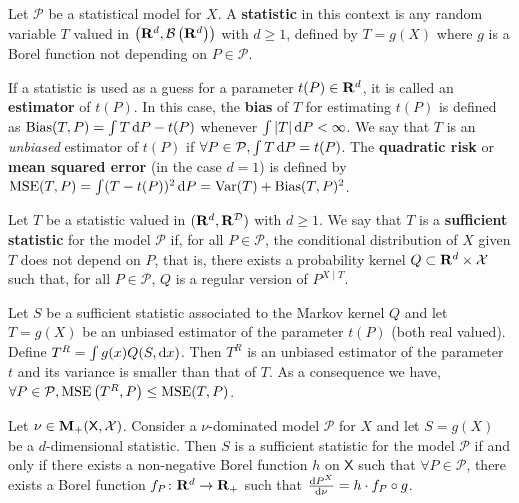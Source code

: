 	\begin{defn}
		Let $\mathcal{P}$ be a statistical model for $X$.
		A \textbf{statistic} in this context is any random variable $T$ valued in $\left(\mathbf{R}^d, \mathcal{B}\left( \mathbf{R}^d \right)\right)$ with $d \geq 1$, defined by $T = g(X)$ where $g$ is a Borel function not depending on $P \in \mathcal{P}$.
	\end{defn}

	If a statistic is used as a guess for a parameter $t(P) \in \mathbf{R}^d$, it is called an \textbf{estimator} of $t(P)$.
	In this case, the \textbf{bias} of $T$ for estimating $t(P)$ is defined as $\operatorname{Bias}(T,P) = \int T \mathop{}\mathopen{}\mathrm{d} P - t(P)$ whenever $\int \left\lvert T\right\rvert \mathop{}\mathopen{}\mathrm{d} P < \infty$.
	We say that $T$ is an \emph{unbiased} estimator of $t(P)$ if $\forall P \in \mathcal{P}, \int T \mathop{}\mathopen{}\mathrm{d} P = t(P)$.
	The \textbf{quadratic risk} or \textbf{mean squared error} (in the case $d = 1$) is defined by $\operatorname{MSE}(T,P) = \int (T - t(P))^2 \mathop{}\mathopen{}\mathrm{d} P = \operatorname{Var}(T) + \operatorname{Bias}(T,P)^2$.

	\begin{defn}
		Let $T$ be a statistic valued in $(\mathbf{R}^d, \mathcal{\mathbf{R}^D})$ with $d \geq 1$.
		We say that $T$ is a \textbf{sufficient statistic} for the model $\mathcal{P}$ if, for all $P \in \mathcal{P}$, the conditional distribution of $X$ given $T$ does not depend on $P$, that is, there exists a probability kernel $Q \subset \mathbf{R}^d \times \mathcal{X}$ such that, for all $P \in \mathcal{P}$, $Q$ is a regular version of $P^{X \mid T}$.
	\end{defn}

	\begin{lem}
		Let $S$ be a sufficient statistic associated to the Markov kernel $Q$ and let $T = g(X)$ be an unbiased estimator of the parameter $t(P)$ (both real valued).
		Define $T^R = \int g(x) Q(S,\mathop{}\mathopen{}\mathrm{d} x)$.
		Then $T^R$ is an unbiased estimator of the parameter $t$ and its variance is smaller than that of $T$.
		As a consequence we have, $\forall P \in \mathcal{P}, \operatorname{MSE} \left( T^R, P \right) \leq \operatorname{MSE} (T,P)$.
	\end{lem}

	\begin{thm}
		Let $\nu \in \mathbf{M}_+(\mathsf{X},\mathcal{X})$.
		Consider a $\nu$-dominated model $\mathcal{P}$ for $X$ and let $S = g(X)$ be a $d$-dimensional statistic.
		Then $S$ is a sufficient statistic for the model $\mathcal{P}$ if and only if there exists a non-negative Borel function $h$ on $\mathsf{X}$ such that $\forall P \in \mathcal{P}$, there exists a Borel function $f_P \colon \mathbf{R}^d \to \mathbf{R}_+$ such that $\frac{\mathop{}\mathopen{}\mathrm{d} P^X}{\mathop{}\mathopen{}\mathrm{d} \nu} = h \cdot f_P \circ g$.
	\end{thm}
	
